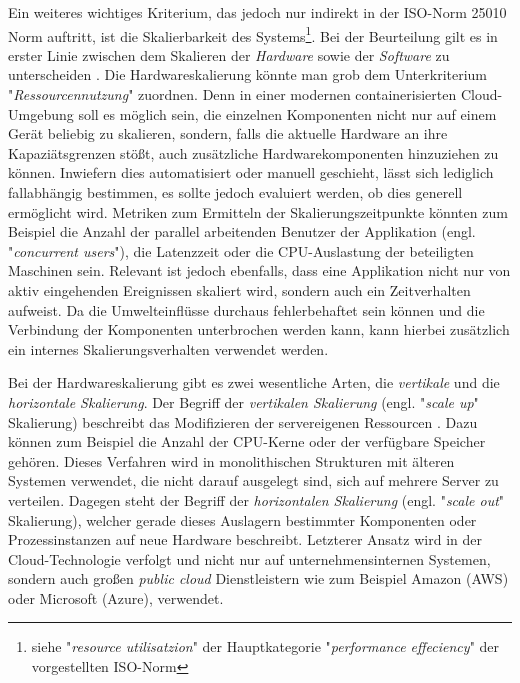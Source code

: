 Ein weiteres wichtiges Kriterium, das jedoch nur indirekt in der ISO-Norm 25010 Norm auftritt, ist die Skalierbarkeit des Systems\footnote{siehe "\emph{resource utilisatzion}" der Hauptkategorie "\emph{performance effeciency}" der vorgestellten ISO-Norm}. Bei der Beurteilung gilt es in erster Linie zwischen dem Skalieren der \emph{Hardware} sowie der \emph{Software} zu unterscheiden \cite{nfr-dotnetcurry}. Die Hardwareskalierung könnte man grob dem Unterkriterium "\emph{Ressourcennutzung}" zuordnen. Denn in einer modernen containerisierten Cloud-Umgebung soll es möglich sein, die einzelnen Komponenten nicht nur auf einem Gerät beliebig zu skalieren, sondern, falls die aktuelle Hardware an ihre Kapaziätsgrenzen stößt, auch zusätzliche Hardwarekomponenten hinzuziehen zu können. Inwiefern dies automatisiert oder manuell geschieht, lässt sich lediglich fallabhängig bestimmen, es sollte jedoch evaluiert werden, ob dies generell ermöglicht wird. Metriken zum Ermitteln der Skalierungszeitpunkte könnten zum Beispiel die Anzahl der parallel arbeitenden Benutzer der Applikation (engl. "\emph{concurrent users}"), die Latenzzeit oder die CPU-Auslastung der beteiligten Maschinen sein. Relevant ist jedoch ebenfalls, dass eine Applikation nicht nur von aktiv eingehenden Ereignissen skaliert wird, sondern auch ein Zeitverhalten aufweist. Da die Umwelteinflüsse durchaus fehlerbehaftet sein können und die Verbindung der Komponenten unterbrochen werden kann, kann hierbei zusätzlich ein internes Skalierungsverhalten verwendet werden.

Bei der Hardwareskalierung gibt es zwei wesentliche Arten, die \emph{vertikale} und die \emph{horizontale Skalierung}. Der Begriff der \emph{vertikalen Skalierung} (engl. "\emph{scale up}" Skalierung) beschreibt das Modifizieren der servereigenen Ressourcen \cite[Absatz \emph{Scalability}]{nfr-dotnetcurry}. Dazu können zum Beispiel die Anzahl der CPU-Kerne oder der verfügbare Speicher gehören. Dieses Verfahren wird in monolithischen Strukturen mit älteren Systemen verwendet, die nicht darauf ausgelegt sind, sich auf mehrere Server zu verteilen. Dagegen steht der Begriff der \emph{horizontalen Skalierung} (engl. "\emph{scale out}" Skalierung), welcher gerade dieses Auslagern bestimmter Komponenten oder Prozessinstanzen auf neue Hardware beschreibt. Letzterer Ansatz wird in der Cloud-Technologie verfolgt und nicht nur auf unternehmensinternen Systemen, sondern auch großen \emph{public cloud} Dienstleistern wie zum Beispiel Amazon (AWS) oder Microsoft (Azure), verwendet.

